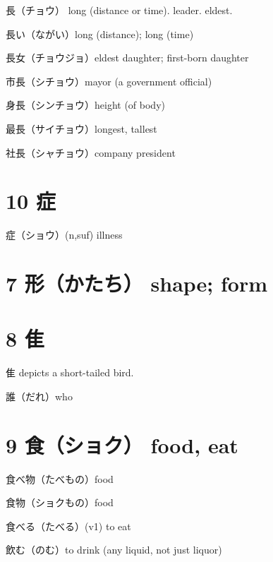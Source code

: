 長（チョウ）
long (distance or time).
leader.
eldest.

長い（ながい）long (distance); long (time)

長女（チョウジョ）eldest daughter; first-born daughter

市長（シチョウ）mayor (a government official)

身長（シンチョウ）height (of body)

最長（サイチョウ）longest, tallest

社長（シャチョウ）company president

\section{10 症}

症（ショウ）(n,suf) illness

\section{7 形（かたち） shape; form}

\section{8 隹}

隹 depicts a short-tailed bird.

誰（だれ）who

\section{9 食（ショク） food, eat}

食べ物（たべもの）food

食物（ショクもの）food

食べる（たべる）(v1) to eat

飲む（のむ）to drink (any liquid, not just liquor)
